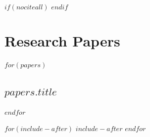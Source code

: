 \documentclass[11pt,a4paper,oneside,openright,titlepage,
  headinclude,footinclude,BCOR=5mm,
  numbers=noenddot,cleardoublepage=empty,
  tablecaptionabove, dottedtoc,
  bibliography=totoc]{scrreprt}
\begin{document}
$if(nociteall)$
\nocite{*}
$endif$

\appendix
\part*{Research Papers}
$for(papers)$
\par\chapter{$papers.title$}

$endfor$
% 
% 
% 

$for(include-after)$
$include-after$
$endfor$
\end{document}
